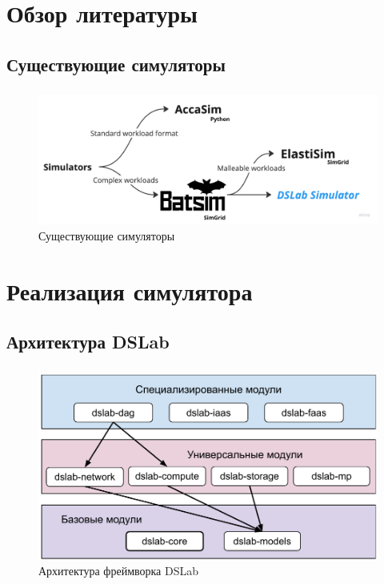 \documentclass[t]{beamer}  %
\begin{document}
	\section{Обзор литературы}
	\subsection{Существующие симуляторы}
	\begin{frame}
		\frametitle{\insertsection} 
		\framesubtitle{\insertsubsection}

		\begin{figure}[H]
			\hspace{-1.1cm}
			\centering
			\includegraphics[width=1.1\linewidth]{images/simulators}
			\vspace{0.2cm}
			\caption*{Существующие симуляторы}
		\end{figure}
	\end{frame}






	\section{Реализация симулятора}

	\subsection{Архитектура DSLab}
	\begin{frame}[fragile]
		\frametitle{\insertsection} 
		\framesubtitle{\insertsubsection}
		\vspace{0.5cm}
		\begin{figure}[H]
			\centering
			\includegraphics[width=\linewidth]{images/dslab_arc}
			\caption*{Архитектура фреймворка DSLab}
		\end{figure}
	\end{frame}
\end{document}
